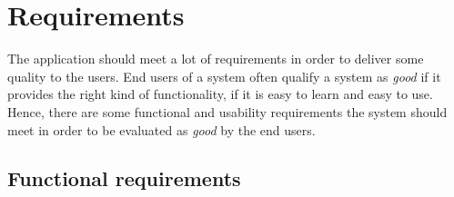 \chapter{Requirements}\label{ch:requirements}

The application should meet a lot of requirements in order to deliver some quality to the users. End users of a system often qualify a system as \textit{good} if it provides the right kind of functionality, if it is easy to learn and easy to use. Hence, there are some functional and usability requirements the system should meet in order to be evaluated as \textit{good} by the end users.

\section{Functional requirements}\label{sec:functional-requirements}

